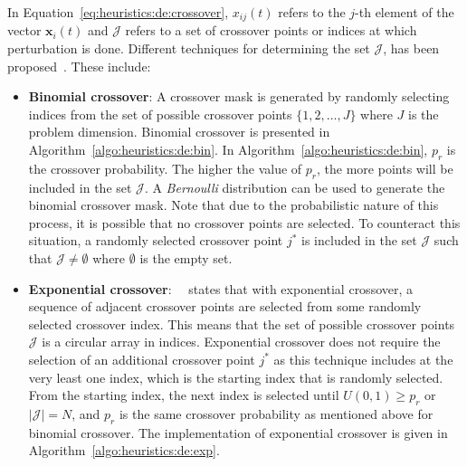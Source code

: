 In Equation~\eqref{eq:heuristics:de:crossover}, $x_{ij}(t)$ refers to the $j$-th element of the vector $\boldsymbol{x}_{i}(t)$ and $\mathcal{J}$ refers to a set of crossover points or indices at which perturbation is done. Different techniques for determining the set $\mathcal{J}$, has been proposed~\cite{ref:storn:1996, ref:storn:1997}. These include:

\begin{itemize}
      \item \textbf{Binomial crossover}: A crossover mask is generated by randomly selecting indices from the set of possible crossover points $\{1,2,\dots,J\}$ where $J$ is the problem dimension. Binomial crossover is presented in Algorithm~\ref{algo:heuristics:de:bin}. In Algorithm~\ref{algo:heuristics:de:bin}, $p_{r}$ is the crossover probability. The higher the value of $p_{r}$, the more points will be included in the set $\mathcal{J}$. A \textit{Bernoulli} distribution can be used to generate the binomial crossover mask. Note that due to the probabilistic nature of this process, it is possible that no crossover points are selected. To counteract this situation, a randomly selected crossover point $j^{*}$ is included in the set $\mathcal{J}$ such that $\mathcal{J} \neq \emptyset$ where $\emptyset$ is the empty set.

      \item \textbf{Exponential crossover}:~\citeauthor{ref:engelbrecht:2007}~\cite{ref:engelbrecht:2007} states that with exponential crossover, a sequence of adjacent crossover points are selected from some randomly selected crossover index. This means that the set of possible crossover points $\mathcal{J}$ is a circular array in indices. Exponential crossover does not require the selection of an additional crossover point $j^{*}$ as this technique includes at the very least one index, which is the starting index that is randomly selected. From the starting index, the next index is selected until $U(0,1) \geq p_{r}$ or $|\mathcal{J}| = N$, and $p_{r}$ is the same crossover probability as mentioned above for binomial crossover. The implementation of exponential crossover is given in Algorithm~\ref{algo:heuristics:de:exp}.
\end{itemize}

